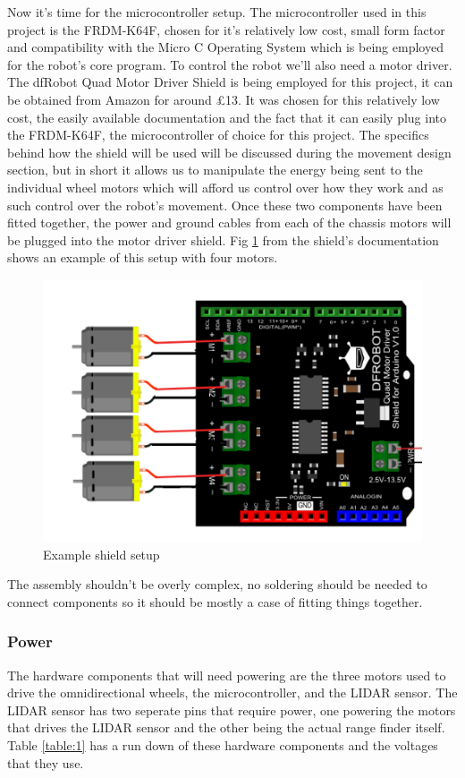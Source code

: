 				Now it's time for the microcontroller setup. The microcontroller used in this project is the FRDM-K64F, chosen for it's relatively low cost, small form factor and compatibility with the Micro C Operating System which is being employed for the robot's core program. To control the robot we'll also need a motor driver. The dfRobot Quad Motor Driver Shield is being employed for this project, it can be obtained from Amazon for around £13. It was chosen for this relatively low cost, the easily available documentation and the fact that it can easily plug into the FRDM-K64F, the microcontroller of choice for this project. The specifics behind how the shield will be used will be discussed during the movement design section, but in short it allows us to manipulate the energy being sent to the individual wheel motors which will afford us control over how they work and as such control over the robot's movement. Once these two components have been fitted together, the power and ground cables from each of the chassis motors will be plugged into the motor driver shield. Fig \ref{fig:shieldsetup} from the shield's documentation shows an example of this setup with four motors.
				
				\begin{figure}[h]
					\centering
					\includegraphics[width=.7\linewidth]{SYNTHESIS/shield_connection.png}
					\caption{Example shield setup}
					\label{fig:shieldsetup}
				\end{figure}
				
				The assembly shouldn't be overly complex, no soldering should be needed to connect components so it should be mostly a case of fitting things together.
				
				\subsubsection{Power}
				The hardware components that will need powering are the three motors used to drive the omnidirectional wheels, the microcontroller, and the LIDAR sensor. The LIDAR sensor has two seperate pins that require power, one powering the motors that drives the LIDAR sensor and the other being the actual range finder itself. Table \ref{table:1} has a run down of these hardware components and the voltages that they use.
				
